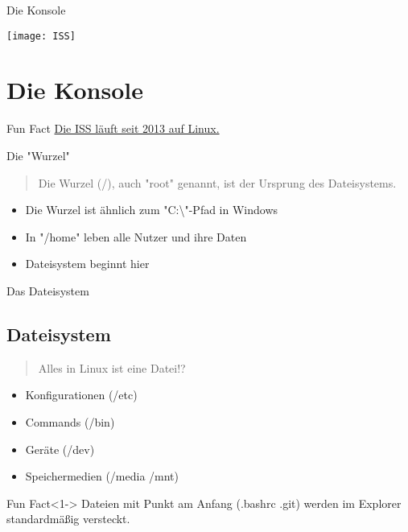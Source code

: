 
\begin{frame}{Die Konsole}
    \begin{center}
        \texttt{[image: ISS]}
    \end{center}


    \section{Die Konsole}\label{sec:die-konsole}
    \begin{exampleblock}{Fun Fact}
        \href{https://www.extremetech.com/extreme/155392-international-space-station-switches-from-windows-to-linux-for-improved-reliability}{Die ISS läuft seit 2013 auf Linux.}
    \end{exampleblock}
\end{frame}

\begin{frame}{Die "Wurzel"}

    \begin{quote}
        Die Wurzel (/), auch "root" genannt, ist der Ursprung des Dateisystems.
    \end{quote}
    \pause

    \begin{itemize}
        \item Die Wurzel ist ähnlich zum "C:\textbackslash"-Pfad in Windows\pause
        \item In "/home" leben alle Nutzer und ihre Daten\pause
        \item Dateisystem beginnt hier
    \end{itemize}

\end{frame}

\begin{frame}{Das Dateisystem}
    \subsection{Dateisystem}\label{subsec:dateisystem}

    \begin{quote}
        Alles in Linux ist eine Datei!?
    \end{quote}


    \begin{itemize}
        \item<2-> Konfigurationen (/etc)
        \item<3-> Commands (/bin)
        \item<4-> Geräte (/dev)
        \item<5-> Speichermedien (/media /mnt)
    \end{itemize}

    \vspace{0.5cm}
    \begin{exampleblock}{Fun Fact}<1->
        Dateien mit Punkt am Anfang (.bashrc .git) werden im Explorer standardmäßig versteckt.
    \end{exampleblock}
\end{frame}

